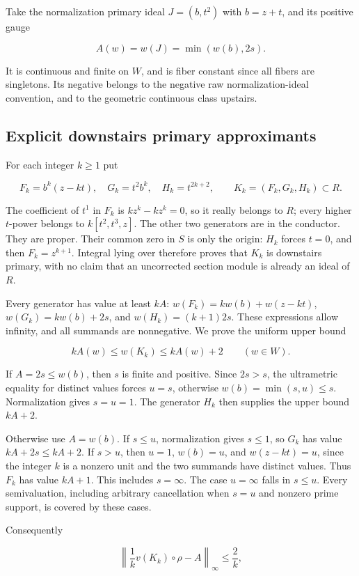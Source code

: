 \documentclass[11pt]{article}
\begin{document}
Take the normalization primary ideal $J=(b,t^2)$ with $b=z+t$, and its positive gauge

\[
A(w)=w(J)=\min(w(b),2s).
\]

It is continuous and finite on $W$, and is fiber constant since all fibers are singletons. Its negative belongs to the negative raw normalization-ideal convention, and to the geometric continuous class upstairs.

\subsection{Explicit downstairs primary approximants}

For each integer $k\ge1$ put

\[
F_k=b^k(z-kt),\quad G_k=t^2b^k,\quad H_k=t^{2k+2},\qquad K_k=(F_k,G_k,H_k)\subset R.
\]

The coefficient of $t^1$ in $F_k$ is $kz^k-kz^k=0$, so it really belongs to $R$; every higher $t$-power belongs to $k[t^2,t^3,z]$. The other two generators are in the conductor. They are proper. Their common zero in $S$ is only the origin: $H_k$ forces $t=0$, and then $F_k=z^{k+1}$. Integral lying over therefore proves that $K_k$ is downstairs primary, with no claim that an uncorrected section module is already an ideal of $R$.

Every generator has value at least $kA$: $w(F_k)=kw(b)+w(z-kt)$, $w(G_k)=kw(b)+2s$, and $w(H_k)=(k+1)2s$. These expressions allow infinity, and all summands are nonnegative. We prove the uniform upper bound

\[
kA(w)\le w(K_k)\le kA(w)+2\qquad(w\in W).
\]

If $A=2s\le w(b)$, then $s$ is finite and positive. Since $2s>s$, the ultrametric equality for distinct values forces $u=s$, otherwise $w(b)=\min(s,u)\le s$. Normalization gives $s=u=1$. The generator $H_k$ then supplies the upper bound $kA+2$.

Otherwise use $A=w(b)$. If $s\le u$, normalization gives $s\le1$, so $G_k$ has value $kA+2s\le kA+2$. If $s>u$, then $u=1$, $w(b)=u$, and $w(z-kt)=u$, since the integer $k$ is a nonzero unit and the two summands have distinct values. Thus $F_k$ has value $kA+1$. This includes $s=\infty$. The case $u=\infty$ falls in $s\le u$. Every semivaluation, including arbitrary cancellation when $s=u$ and nonzero prime support, is covered by these cases.

Consequently

\[
\left\|\frac1k v(K_k)\circ\rho-A\right\|_\infty\le\frac2k,
\]
\end{document}
